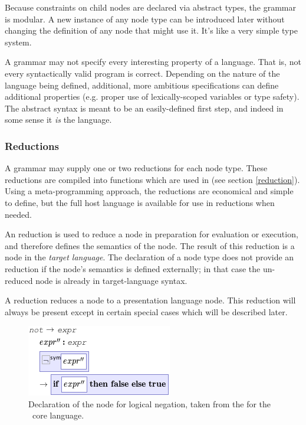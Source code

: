 Because constraints on child nodes are declared via abstract types, the grammar is modular. A new instance of any node type can be introduced later without changing the definition of any node that might use it. It's like a very simple type system. 



A grammar may not specify every interesting property of a language. That is, not every syntactically valid program is correct. Depending on the nature of the language being defined, additional, more ambitious specifications can define additional properties (e.g. proper use of lexically-scoped variables or type safety). The abstract syntax is meant to be an easily-defined first step, and indeed in some sense it \emph{is} the language.

\subsubsection{Reductions}
A grammar may supply one or two reductions for each node type. These reductions are compiled into functions which are used in \todo{} (see section \ref{reduction}). Using a meta-programming approach, the reductions are economical and simple to define, but the full host language is available for use in reductions when needed.

An  reduction is used to reduce a node in preparation for evaluation or execution, and therefore defines the semantics of the node. The result of this reduction is a node in the \emph{target language}. The declaration of a node type does not provide an  reduction if the node's semantics is defined externally; in that case the un-reduced node is already in target-language syntax.

A  reduction reduces a node to a presentation language node. This reduction will always be present except in certain special cases which will be described later.

\begin{figure}[ht]

  \includegraphics[scale=0.8]{src/image/not.png}  %

  \caption{\label{fig-and} Declaration of the  node for logical negation, taken from the  for the \Meta\ core language.}
\end{figure}

